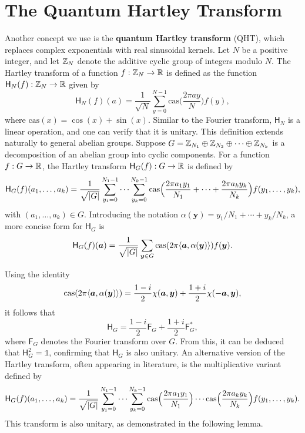 \documentclass[12pt]{report}
\newcommand{\cas}{\mathrm{cas}}
\newcommand{\cht}{\mathsf{H}}
\newcommand{\cft}{\mathsf{F}}
\begin{document}
\section{The Quantum Hartley Transform}

Another concept we use is the \textbf{quantum Hartley transform} (QHT), which replaces complex exponentials with real sinusoidal kernels.
Let $N$ be a positive integer, and let $\mathbb{Z}_N$ denote the additive cyclic group of integers modulo $N$. The Hartley transform of a function $f: \mathbb{Z}_N \to \mathbb{R}$ is defined as the function $\cht_N(f): \Z_N \to \R$ given by
\[
\cht_N(f)(a) = \frac{1}{\sqrt{N}} \sum_{y = 0}^{N - 1} \cas\Big(\frac{2 \pi ay}{N}\Big) f(y),
\]
where $\cas(x) = \cos(x) + \sin(x)$. Similar to the Fourier transform, $\cht_N$ is a linear operation, and one can verify that it is unitary. This definition extends naturally to general abelian groups. Suppose $G = \mathbb{Z}_{N_1} \oplus \mathbb{Z}_{N_2} \oplus \cdots \oplus \mathbb{Z}_{N_k}$ is a decomposition of an abelian group into cyclic components. For a function $f: G \to \mathbb{R}$, the Hartley transform $\cht_G(f): G \to \R$ is defined by
\begin{equation}
    \label{eq:cht-add}
    \cht_G(f)(a_1, \dots, a_k) = \frac{1}{\sqrt{\abs{G}}} \sum_{y_1 = 0}^{N_1 - 1} \cdots \sum_{y_k = 0}^{N_k - 1} \cas\Big(\frac{2 \pi a_1y_1}{N_1} + \cdots + \frac{2 \pi a_ky_k}{N_k}\Big) f(y_1, \dots, y_k),
\end{equation}
with $(a_1, \dots, a_k) \in G$. Introducing the notation $\alpha(\bm{y}) = y_1 / N_1 + \cdots + y_k / N_k$, a more concise form for $\cht_G$ is
\[
\cht_G(f)(\bm{a}) = \frac{1}{\sqrt{\abs{G}}} \sum_{\bm{y} \in G} \cas(2\pi \lrang{\bm{a}, \alpha(\bm{y})}) f(\bm{y}).
\]

Using the identity
\[
\cas(2\pi \lrang{\bm{a}, \alpha(\bm{y})}) = \frac{1 - i}{2}\chi(\bm{a}, \bm{y}) + \frac{1 + i}{2}\chi(-\bm{a}, \bm{y}),
\]
it follows that
\begin{equation}
    \label{eq:ht-ft}
    \cht_G = \frac{1 - i}{2}\cft_G + \frac{1 + i}{2}\cft_G^*,
\end{equation}
where $\cft_G$ denotes the Fourier transform over $G$. From this, it can be deduced that $\cht_G^2 = \mathds{1}$, confirming that $\cht_G$ is also unitary. An alternative version of the Hartley transform, often appearing in literature, is the multiplicative variant defined by
\begin{equation}
    \label{eq:cht-mult}
    \cht_G(f)(a_1, \dots, a_k) = \frac{1}{\sqrt{\abs{G}}} \sum_{y_1 = 0}^{N_1 - 1} \cdots \sum_{y_k = 0}^{N_k - 1} \mathrm{cas}\Big(\frac{2 \pi a_1y_1}{N_1}\Big) \cdots \cas\Big(\frac{2 \pi a_ky_k}{N_k}\Big) f(y_1, \dots, y_k).
\end{equation}
This transform is also unitary, as demonstrated in the following lemma.
\end{document}
